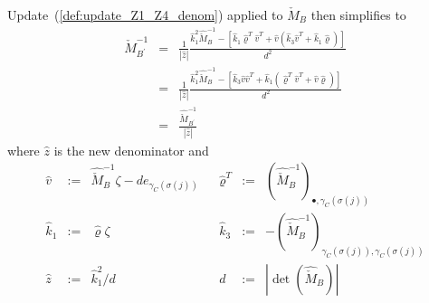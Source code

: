 \documentclass[a4paper]{article}
\begin{document}
Update~(\ref{def:update_Z1_Z4_denom})
applied to $\check{M}_{B}$ then simplifies to
\begin{eqnarray}
\label{def:update_Z4}
\check{M}_{B^{\prime}}^{-1}
&=&
\frac{1}{\left|\hat{z}\right|}
\frac{
\hat{k}_{1}^{2}\hat{\check{M}}_{B}^{-1}
-\left[
  \hat{k}_{1}\hat{\varrho}^{T}\hat{v}^{T}
  +\hat{v}\left(\hat{k}_{3}\hat{v}^{T}+\hat{k}_{1}\hat{\varrho}\right)  
 \right]
}{d^{2}}
\nonumber \\
&=&
\frac{1}{\left|\hat{z}\right|}
\frac{
\hat{k}_{1}^{2}\hat{\check{M}}_{B}^{-1}
-\left[
  \hat{k}_{3}\hat{v}\hat{v}^{T}
  +\hat{k}_{1}\left(\hat{\varrho}^{T}\hat{v}^{T}+\hat{v}\hat{\varrho}\right)  
 \right]
}{d^{2}}
\nonumber \\
&=&
\frac{\hat{\check{M}}_{B^{\prime}}^{-1}}{\left|\hat{z}\right|}
\end{eqnarray}
where $\hat{z}$ is the new denominator and
\begin{equation}
\label{def:update_Z4_entities}
\begin{array}{rclcrcl}
\hat{v}
&:=&
\hat{\check{M}}_{B}^{-1}\zeta -de_{\gamma_{C}(\sigma(j))}
&&
\hat{\varrho}^{T}
&:=&
\left(\hat{\check{M}}_{B}^{-1}\right)_{\bullet, \gamma_{C}(\sigma(j))}
\\
\hat{k}_{1}
&:=&
\hat{\varrho}\zeta
&&
\hat{k}_{3}
&:=&
-\left(\hat{\check{M}}_{B}^{-1}\right)_{\gamma_{C}(\sigma(j)),
  \gamma_{C}(\sigma(j))}
\\
\hat{z}
&:=&
\hat{k}_{1}^{2}/d
&&
d
&:=&
\left|\det(\hat{\check{M}}_{B})\right|
\end{array}
\end{equation}
\end{document}
